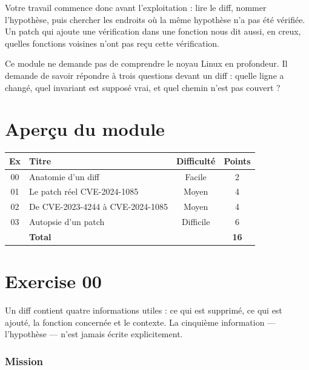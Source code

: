 \documentclass{training}
\begin{document}
Votre travail commence donc avant l'exploitation : lire le diff, nommer
l'hypothèse, puis chercher les endroits où la même hypothèse n'a pas été
vérifiée. Un patch qui ajoute une vérification dans une fonction nous dit
aussi, en creux, quelles fonctions voisines n'ont pas reçu cette
vérification.

\begin{info}
Ce module ne demande pas de comprendre le noyau Linux en profondeur. Il
demande de savoir répondre à trois questions devant un diff : quelle ligne a
changé, quel invariant est supposé vrai, et quel chemin n'est pas couvert ?
\end{info}

\chapter{Aperçu du module}

\begin{center}
\begin{tabularx}{\linewidth}{|c|l|c|c|}
\hline
\textbf{Ex} & \textbf{Titre} & \textbf{Difficulté} & \textbf{Points} \\ \hline
00 & Anatomie d'un diff & Facile & 2 \\
01 & Le patch réel CVE-2024-1085 & Moyen & 4 \\
02 & De CVE-2023-4244 à CVE-2024-1085 & Moyen & 4 \\
03 & Autopsie d'un patch & Difficile & 6 \\ \hline
& \textbf{Total} & & \textbf{16} \\ \hline
\end{tabularx}
\end{center}

\startexercices

\chapter{Exercise 00}
\makeheaderfiles

Un diff contient quatre informations utiles : ce qui est supprimé, ce qui
est ajouté, la fonction concernée et le contexte. La cinquième information
--- l'hypothèse --- n'est jamais écrite explicitement.

\subsection*{Mission}
\end{document}
